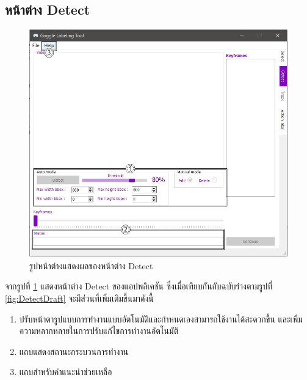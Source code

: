 \subsection*{หน้าต่าง Detect}
\begin{figure}[!ht]
  \centering
    \includegraphics[scale=0.4]{chapter4/images/Final_ui/Detect.jpg}
    \caption{รูปหน้าต่างแสดงผลของหน้าต่าง Detect}
    \label{fig:final_detect}
\end{figure}
จากรูปที่ \ref{fig:final_detect} แสดงหน้าต่าง Detect ของแอปพลิเคชัน ซึ่งเมื่อเทียบกันกับฉบับร่างตามรูปที่ \ref{fig:DetectDraft} จะมีส่วนที่เพิ่มเติมขึ้นมาดังนี้
\begin{enumerate}
	\item ปรับหน้าตารูปแบบการทำงานแบบอัตโนมัติและกำหนดเองสามารถใช้งานได้สะดวกขึ้น และเพิ่มความหลากหลายในการปรับแก้ไขการทำงานอัตโนมัติ
	\item แถบแสดงสถานะกระบวนการทำงาน
	\item แถบสำหรับคำแนะนำช่วยเหลือ
\end{enumerate}		

\clearpage
